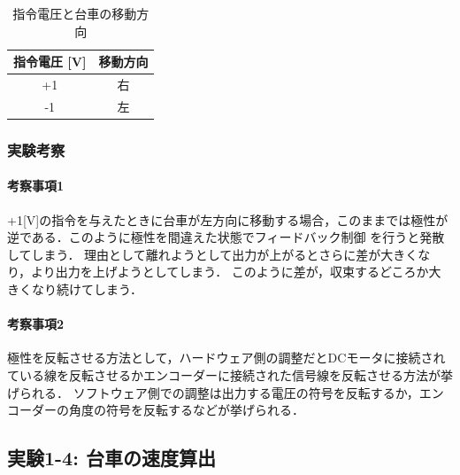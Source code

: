 \begin{table}[h]
  \centering
  \caption{指令電圧と台車の移動方向}
  \label{tab:command_voltage_direction}
  \begin{tabular}{|c|c|}
    \hline
    指令電圧 [V] & 移動方向 \\
    \hline
    +1           & 右       \\
    \hline
    -1           & 左       \\
    \hline
  \end{tabular}
\end{table}

\subsubsection{実験考察}
\paragraph{考察事項1}
+1[V]の指令を与えたときに台車が左方向に移動する場合，このままでは極性が逆である．このように極性を間違えた状態でフィードバック制御
を行うと発散してしまう．
理由として離れようとして出力が上がるとさらに差が大きくなり，より出力を上げようとしてしまう．
このように差が，収束するどころか大きくなり続けてしまう．

\paragraph{考察事項2}
極性を反転させる方法として，ハードウェア側の調整だとDCモータに接続されている線を反転させるかエンコーダーに接続された信号線を反転させる方法が挙げられる．
ソフトウェア側での調整は出力する電圧の符号を反転するか，エンコーダーの角度の符号を反転するなどが挙げられる．


\subsection{実験1-4: 台車の速度算出}


